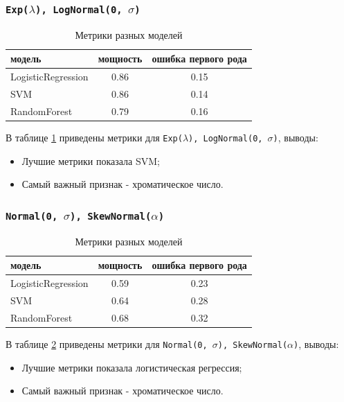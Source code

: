 \documentclass[12pt,a4paper]{report}
\begin{document}
\subsubsection{\texttt{Exp($\lambda$), LogNormal(0, $\sigma$)}}
\begin{table}[htbp]
  \centering
  \caption{Метрики разных моделей}
  \label{tab:results_exp_lognormal_25}
  \begin{tabular}{@{} l c c @{}}
    \toprule
    модель & мощность & ошибка первого рода \\
    \midrule
    LogisticRegression & 0.86 & 0.15 \\
    SVM                & 0.86 & 0.14 \\
    RandomForest       & 0.79 & 0.16 \\
    \bottomrule
  \end{tabular}
\end{table}

В таблице \ref{tab:results_exp_lognormal_25} приведены метрики для \texttt{Exp($\lambda$), LogNormal(0, $\sigma$)}, выводы:
\begin{itemize}
    \item Лучшие метрики показала SVM;
    \item Самый важный признак - хроматическое число.
\end{itemize}

\subsubsection{\texttt{Normal(0, $\sigma$), SkewNormal($\alpha$)}}
\begin{table}[htbp]
  \centering
  \caption{Метрики разных моделей}
  \label{tab:results_normal_skewnormal_25}
  \begin{tabular}{@{} l c c @{}}
    \toprule
    модель & мощность & ошибка первого рода \\
    \midrule
    LogisticRegression & 0.59 & 0.23 \\
    SVM                & 0.64 & 0.28 \\
    RandomForest       & 0.68 & 0.32 \\
    \bottomrule
  \end{tabular}
\end{table}

В таблице \ref{tab:results_normal_skewnormal_25} приведены метрики для \texttt{Normal(0, $\sigma$), SkewNormal($\alpha$)}, выводы:
\begin{itemize}
    \item Лучшие метрики показала логистическая регрессия;
    \item Самый важный признак - хроматическое число.
\end{itemize}
\end{document}
